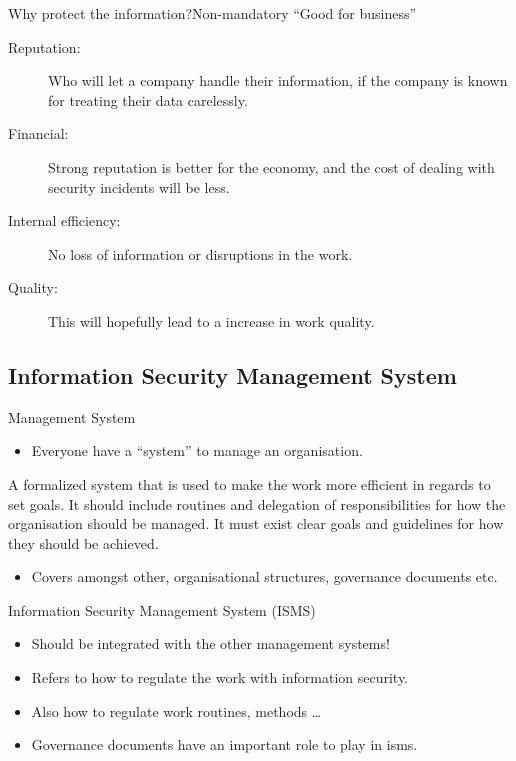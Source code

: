 \documentclass{beamer}
\begin{document}
\begin{frame}{Why protect the information?}{Non-mandatory}
  \enquote{Good for business}
  \begin{description}
    \item[Reputation:] Who will let a company handle their information, if the
      company is known for treating their data carelessly.
    \item[Financial:] Strong reputation is better for the economy, and the cost
      of dealing with security incidents will be less.
    \item[Internal efficiency:] No loss of information or disruptions in the
      work.
    \item[Quality:] This will hopefully lead to a increase in work quality.
  \end{description}
\end{frame}

\subsection{Information Security Management System}
\begin{frame}{Management System}
  \begin{itemize}
    \item Everyone have a \enquote{system} to manage an organisation.
  \end{itemize}
      A formalized system that is used to make the work more efficient in
      regards to set goals. It should include routines and delegation of
      responsibilities for how the organisation should be managed. It must exist
      clear goals and guidelines for how they should be achieved.
  \begin{itemize}
    \item Covers amongst other, organisational structures, governance documents
      etc.
  \end{itemize}
\end{frame}

\begin{frame}{Information Security Management System (ISMS)}
  \begin{itemize}
    \item Should be integrated with the other management systems!
    \item Refers to how to regulate the work with information security.
    \item Also how to regulate work routines, methods \dots
    \item Governance documents have an important role to play in \ac{isms}\@.
  \end{itemize}
\end{frame}
\end{document}
